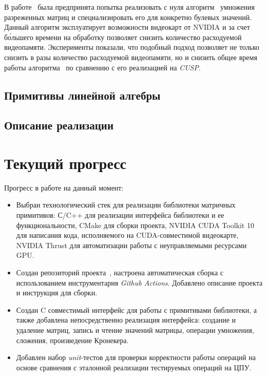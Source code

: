 \documentclass[14pt]{matmex-diploma-custom}
\begin{document}
В работе~\cite{inproceedings:cfqp_matrix_with_single_source} была предпринята попытка реализовать с нуля алгоритм~\cite{inproceedings:spgemm_mem_saving_for_nvidia} умножения разреженных матриц и специализировать его для конкретно булевых значений. Данный алгоритм эксплуатирует возможности  видеокарт от NVIDIA и за счет б\'ольшего времени на обработку позволяет снизить количество расходуемой видеопамяти. Эксперименты показали, что подобный подход позволяет не только снизить в разы количество расходуемой видеопамяти, но и снизить общее время работы алгоритма~\cite{inproceedings:matrix_cfpq} по сравнению с его реализацией на \textit{CUSP}. 

\subsection{Примитивы линейной алгебры}

\subsection{Описание реализации}

\section{Текущий прогресс}

Прогресс в работе на данный момент:

\begin{itemize}
    \item Выбран технологический стек для реализации библиотеки матричных примитивов: С/C++ для реализации интерфейса библиотеки и ее функциональности, CMake для сборки проекта, NVIDIA CUDA Toolkit 10 для написания кода, исполняемого на CUDA-совместимой видеокарте, NVIDIA Thrust для автоматизации работы с неуправляемыми ресурсами GPU. 
    \item Создан репозиторий проекта~\cite{net:cubool_project}, настроена автоматическая сборка с использованием инструментария \textit{Github Actions}. Добавлено описание проекта и инструкция для сборки.
    \item Создан C совместимый интерфейс для работы с примитивами библиотеки, а также добавлена непосредственно реализация интерфейса: создание и удаление матриц, запись и чтение значений матрицы, операции умножения, сложения, произведение Кронекера.
    \item Добавлен набор \textit{unit}-тестов для проверки корректности работы операций на основе сравнения с эталонной реализации тестируемых операций на ЦПУ.
\end{itemize}




\setmonofont[Mapping=tex-text]{CMU Typewriter Text}


\end{document}
